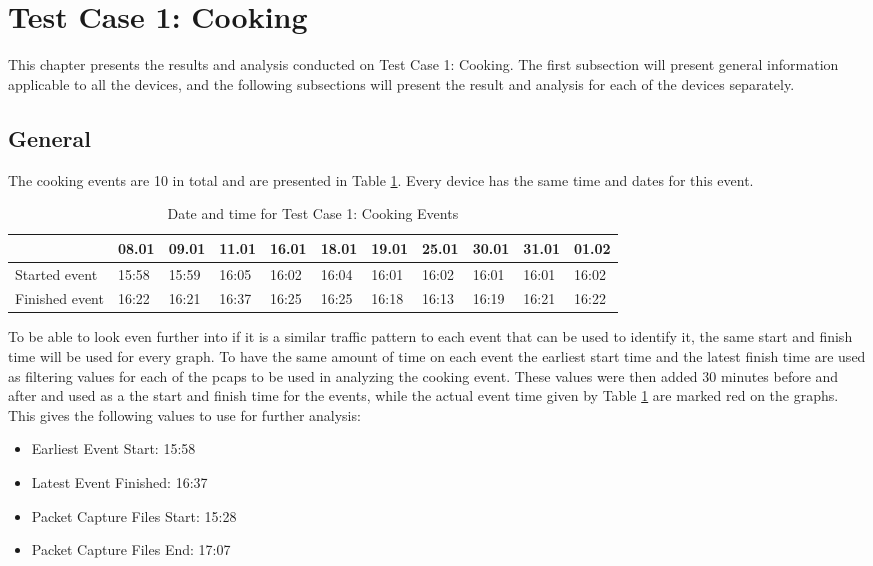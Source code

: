 \newpage
\section{Test Case 1: Cooking}
This chapter presents the results and analysis conducted on Test Case 1: Cooking. The first subsection will present general information applicable to all the devices, and the following subsections will present the result and analysis for each of the devices separately. 
\subsection{General}
The cooking events are 10 in total and are presented in Table \ref{tab:CookingDates}. Every device has the same time and dates for this event. 
\begin{table}[H]
    \centering
    \caption{Date and time for Test Case 1: Cooking Events}
    \begin{adjustbox}{width=1\textwidth}
            \begin{tabular}{l|l|l|l|l|l|l|l|l|l|l|}
            \cline{2-11} & 08.01 & 09.01 & 11.01 & 16.01 & 18.01 & 19.01 & 25.01 & 30.01 & 31.01 & 01.02 \\
            \hline
            \multicolumn{1}{|l|}{Started event}  & 15:58 & 15:59 & 16:05 & 16:02 & 16:04 & 16:01 & 16:02 & 16:01 & 16:01 & 16:02 \\ 
            \hline
            \multicolumn{1}{|l|}{Finished event} & 16:22 & 16:21 & 16:37 & 16:25 & 16:25 & 16:18 & 16:13 & 16:19 & 16:21 & 16:22 \\ \hline
            \end{tabular}
    \end{adjustbox}
    \label{tab:CookingDates}
\end{table}
\FloatBarrier

To be able to look even further into if it is a similar traffic pattern to each event that can be used to identify it, the same start and finish time will be used for every graph. To have the same amount of time on each event the earliest start time and the latest finish time are used as filtering values for each of the pcaps to be used in analyzing the cooking event. These values were then added 30 minutes before and after and used as a the start and finish time for the events, while the actual event time given by Table \ref{tab:CookingDates} are marked red on the graphs. This gives the following values to use for further analysis:

\begin{itemize}
    \item Earliest Event Start: 15:58
    \item Latest Event Finished: 16:37
    \item Packet Capture Files Start: 15:28
    \item Packet Capture Files End: 17:07
\end{itemize}

